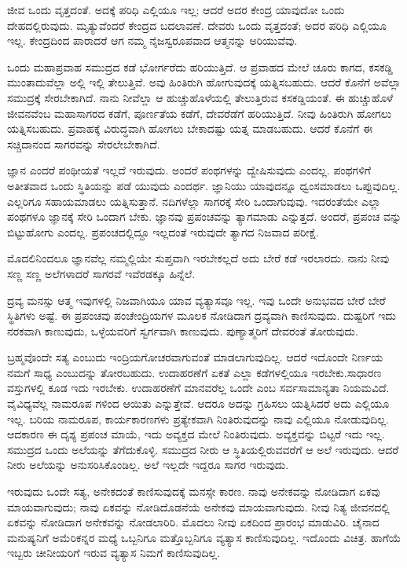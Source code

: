 ಜೀವ ಒಂದು ವೃತ್ತದಂತೆ. ಅದಕ್ಕೆ ಪರಿಧಿ ಎಲ್ಲಿಯೂ ಇಲ್ಲ; ಆದರೆ ಅದರ ಕೇಂದ್ರ ಯಾವುದೋ ಒಂದು ದೇಹದಲ್ಲಿರುವುದು. ಮೃತ್ಯುವೆಂದರೆ ಕೇಂದ್ರದ ಬದಲಾವಣೆ. ದೇವರು ಒಂದು ವೃತ್ತದಂತೆ; ಅದರ ಪರಿಧಿ ಎಲ್ಲಿಯೂ ಇಲ್ಲ. ಕೇಂದ್ರದಿಂದ ಪಾರಾದರೆ ಆಗ ನಮ್ಮ ನೈಜಸ್ವರೂಪವಾದ ಆತ್ಮನನ್ನು ಅರಿಯುವೆವು.

ಒಂದು ಮಹಾಪ್ರವಾಹ ಸಮುದ್ರದ ಕಡೆ ಭೋರ್ಗರೆದು ಹರಿಯುತ್ತಿದೆ. ಆ ಪ್ರವಾಹದ ಮೇಲೆ ಚೂರು ಕಾಗದ, ಕಸಕಡ್ಡಿ ಮುಂತಾದುವೆಲ್ಲಾ ಅಲ್ಲಿ ಇಲ್ಲಿ ತೇಲುತ್ತಿವೆ. ಅವು ಹಿಂತಿರುಗಿ ಹೋಗುವುದಕ್ಕೆ ಯತ್ನಿಸಬಹುದು. ಆದರೆ ಕೊನೆಗೆ ಅವೆಲ್ಲಾ ಸಮುದ್ರಕ್ಕೆ ಸೇರಬೇಕಾಗಿದೆ. ನಾನು ನೀವೆಲ್ಲಾ ಆ ಹುಚ್ಚುಹೊಳೆಯಲ್ಲಿ ತೇಲುತ್ತಿರುವ ಕಸಕಡ್ಡಿಯಂತೆ. ಈ ಹುಚ್ಚುಹೊಳೆ ಜೀವನವೆಂಬ ಮಹಾಸಾಗರದ ಕಡೆಗೆ, ಪೂರ್ಣತೆಯ ಕಡೆಗೆ, ದೇವರೆಡೆಗೆ ಹರಿಯುತ್ತಿದೆ. ನೀವು ಹಿಂತಿರುಗಿ ಹೋಗಲು ಯತ್ನಿಸಬಹುದು. ಪ್ರವಾಹಕ್ಕೆ ವಿರುದ್ಧವಾಗಿ ಹೋಗಲು ಬೇಕಾದಷ್ಟು ಯತ್ನ ಮಾಡಬಹುದು. ಆದರೆ ಕೊನೆಗೆ ಈ ಸಚ್ಚಿದಾನಂದ ಸಾಗರವನ್ನು ಸೇರಲೇಬೇಕಾಗಿದೆ.

ಜ್ಞಾನ ಎಂದರೆ ಪಂಥೀಯತೆ ಇಲ್ಲದೆ ಇರುವುದು. ಅಂದರೆ ಪಂಥಗಳನ್ನು ದ್ವೇಷಿಸುವುದು ಎಂದಲ್ಲ. ಪಂಥಗಳಿಗೆ ಅತೀತವಾದ ಒಂದು ಸ್ಥಿತಿಯನ್ನು ಪಡೆ ಯುವುದು ಎಂದರ್ಥ. ಜ್ಞಾನಿಯು ಯಾವುದನ್ನೂ ಧ್ವಂಸಮಾಡಲು ಒಪ್ಪುವುದಿಲ್ಲ. ಎಲ್ಲರಿಗೂ ಸಹಾಯಮಾಡಲು ಯತ್ನಿಸುತ್ತಾನೆ. ನದಿಗಳೆಲ್ಲಾ ಸಾಗರಕ್ಕೆ ಸೇರಿ ಒಂದಾಗುವುವು. ಇದರಂತೆಯೇ ಎಲ್ಲಾ ಪಂಥಗಳೂ ಜ್ಞಾನಕ್ಕೆ ಸೇರಿ ಒಂದಾಗ ಬೇಕು. ಜ್ಞಾನವು ಪ್ರಪಂಚವನ್ನು ತ್ಯಾಗಮಾಡು ಎನ್ನುತ್ತದೆ. ಅಂದರೆ, ಪ್ರಪಂಚ ವನ್ನು ಬಿಟ್ಟುಹೋಗು ಎಂದಲ್ಲ. ಪ್ರಪಂಚದಲ್ಲಿದ್ದೂ ಇಲ್ಲದಂತೆ ಇರುವುದೇ ತ್ಯಾಗದ ನಿಜವಾದ ಪರೀಕ್ಷೆ.

ಮೊದಲಿನಿಂದಲೂ ಜ್ಞಾನವೆಲ್ಲ ನಮ್ಮಲ್ಲಿಯೇ ಸುಪ್ತವಾಗಿ ಇರಬೇಕಲ್ಲದೆ ಅದು ಬೇರೆ ಕಡೆ ಇರಲಾರದು. ನಾನು ನೀವು ಸಣ್ಣ ಸಣ್ಣ ಅಲೆಗಳಾದರೆ ಸಾಗರವೆ ಇವೆರಡಕ್ಕೂ ಹಿನ್ನೆಲೆ.

ದ್ರವ್ಯ ಮನಸ್ಸು ಆತ್ಮ ಇವುಗಳಲ್ಲಿ ನಿಜವಾಗಿಯೂ ಯಾವ ವ್ಯತ್ಯಾಸವೂ ಇಲ್ಲ. ಇವು ಒಂದೇ ಅನುಭವದ ಬೇರೆ ಬೇರೆ ಸ್ಥಿತಿಗಳು ಅಷ್ಟೆ. ಈ ಪ್ರಪಂಚವು ಪಂಚೇಂದ್ರಿಯಗಳ ಮೂಲಕ ನೋಡಿದಾಗ ದ್ರವ್ಯವಾಗಿ ಕಾಣಿಸುವುದು. ದುಷ್ಟರಿಗೆ ಇದು ನರಕವಾಗಿ ಕಾಣುವುದು, ಒಳ್ಳೆಯವರಿಗೆ ಸ್ವರ್ಗವಾಗಿ ಕಾಣುವುದು. ಪುಣ್ಯಾತ್ಮರಿಗೆ ದೇವರಂತೆ ತೋರುವುದು.

ಬ್ರಹ್ಮವೊಂದೇ ಸತ್ಯ ಎಂಬುದು ಇಂದ್ರಿಯಗೋಚರವಾಗುವಂತೆ ಮಾಡಲಾಗುವುದಿಲ್ಲ. ಆದರೆ ಇದೊಂದೇ ನಿರ್ಣಯ ನಮಗೆ ಸಾಧ್ಯ ಎಂಬುದನ್ನು ತೋರಬಹುದು. ಉದಾಹರಣೆಗೆ ಏಕತೆ ಎಲ್ಲಾ ಕಡೆಗಳಲ್ಲಿಯೂ ಇರಬೇಕು.ಸಾಧಾರಣ ವಸ್ತುಗಳಲ್ಲಿ ಕೂಡ ಇದು ಇರಬೇಕು. ಉದಾಹರಣೆಗೆ ಮಾನವರೆಲ್ಲ ಒಂದೇ ಎಂಬ ಸರ್ವಸಾಮಾನ್ಯತಾ ನಿಯಮವಿದೆ. ವೈವಿಧ್ಯವೆಲ್ಲ ನಾಮರೂಪ ಗಳಿಂದ ಆಯಿತು ಎನ್ನುತ್ತೇವೆ. ಆದರೂ ಅದನ್ನು ಗ್ರಹಿಸಲು ಯತ್ನಿಸಿದರೆ ಅದು ಎಲ್ಲಿಯೂ ಇಲ್ಲ. ಬರಿಯ ನಾಮರೂಪ, ಕಾರ್ಯಕಾರಣಗಳು ಪ್ರತ್ಯೇಕವಾಗಿ ನಿಂತಿರುವುದನ್ನು ನಾವು ಎಲ್ಲಿಯೂ ನೋಡುವುದಿಲ್ಲ. ಆದಕಾರಣ ಈ ದೃಶ್ಯ ಪ್ರಪಂಚ ಮಾಯೆ, ಇದು ಅವ್ಯಕ್ತದ ಮೇಲೆ ನಿಂತಿರುವುದು. ಅವ್ಯಕ್ತವನ್ನು ಬಿಟ್ಟರೆ ಇದು ಇಲ್ಲ. ಸಮುದ್ರದ ಒಂದು ಅಲೆಯನ್ನು ತೆಗೆದುಕೊಳ್ಳಿ. ಸಮುದ್ರದ ನೀರು ಆ ಸ್ಥಿತಿಯಲ್ಲಿರುವವರೆಗೆ ಆ ಅಲೆ ಇರುವುದು. ಆದರೆ ನೀರು ಅಲೆಯನ್ನು ಅನುಸರಿಸಿಕೊಂಡಿಲ್ಲ. ಅಲೆ ಇಲ್ಲದೇ ಇದ್ದರೂ ಸಾಗರ ಇರುವುದು.

ಇರುವುದು ಒಂದೇ ಸತ್ಯ, ಅನೇಕದಂತೆ ಕಾಣಿಸುವುದಕ್ಕೆ ಮನಸ್ಸೇ ಕಾರಣ. ನಾವು ಅನೇಕವನ್ನು ನೋಡಿದಾಗ ಏಕವು ಮಾಯವಾಗುವುದು; ನಾವು ಏಕವನ್ನು ನೋಡಿದೊಡನೆಯೆ ಅನೇಕವು ಮಾಯವಾಗುವುದು. ನೀವು ನಿತ್ಯ ಜೀವನದಲ್ಲಿ ಏಕವನ್ನು ನೋಡಿದಾಗ ಅನೇಕವನ್ನು ನೋಡಲಾರಿರಿ. ಮೊದಲು ನೀವು ಏಕದಿಂದ ಪ್ರಾರಂಭ ಮಾಡುವಿರಿ. ಚೈನಾದ ಮನುಷ್ಯನಿಗೆ ಅಮೆರಿಕನ್ನರ ಮಧ್ಯೆ ಒಬ್ಬನಿಗೂ ಮತ್ತೊಬ್ಬನಿಗೂ ವ್ಯತ್ಯಾಸ ಕಾಣಿಸುವುದಿಲ್ಲ. ಇದೊಂದು ವಿಚಿತ್ರ. ಹಾಗೆಯೆ ಇಬ್ಬರು ಚೀನೀಯರಿಗೆ ಇರುವ ವ್ಯತ್ಯಾಸ ನಿಮಗೆ ಕಾಣಿಸುವುದಿಲ್ಲ.

